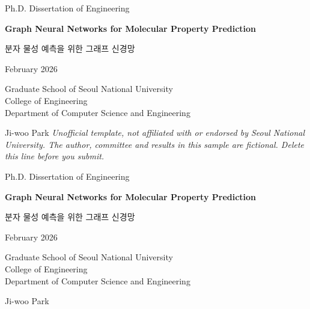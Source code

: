 \documentclass[11pt,twoside,openany]{report}
\begin{document}

\begin{titlepage}
\centering
Ph.D. Dissertation of Engineering\par
\vspace{0.8in}
{\Large\bfseries Graph Neural Networks for Molecular Property Prediction\par}
\vspace{0.15in}
{\large 분자 물성 예측을 위한 그래프 신경망\par}
\vspace{1.4in}
February 2026\par
\vspace{0.8in}
Graduate School of Seoul National University\\
College of Engineering\\
Department of Computer Science and Engineering\par
\vspace{0.4in}
{\large Ji-woo Park}
\vfill
{\footnotesize\itshape Unofficial template, not affiliated with or endorsed by Seoul National University. The author, committee and results in this sample are fictional. Delete this line before you submit.}
\end{titlepage}

\mbox{}\clearpage

\begin{titlepage}
\centering
Ph.D. Dissertation of Engineering\par
\vspace{0.8in}
{\Large\bfseries Graph Neural Networks for Molecular Property Prediction\par}
\vspace{0.15in}
{\large 분자 물성 예측을 위한 그래프 신경망\par}
\vspace{1.4in}
February 2026\par
\vspace{0.8in}
Graduate School of Seoul National University\\
College of Engineering\\
Department of Computer Science and Engineering\par
\vspace{0.4in}
{\large Ji-woo Park}
\vfill
\end{titlepage}


\end{document}
